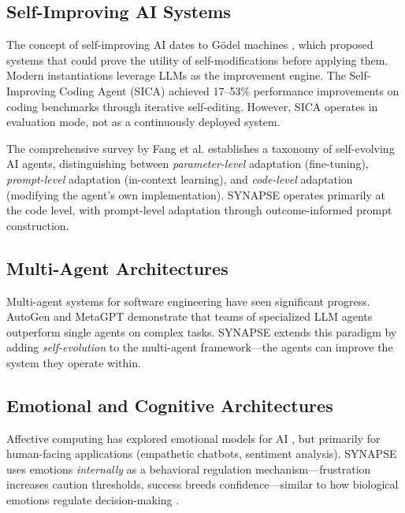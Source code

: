 \documentclass[11pt,a4paper]{article}
\begin{document}
\subsection{Self-Improving AI Systems}

The concept of self-improving AI dates to G\"{o}del machines \cite{schmidhuber2003godel}, which proposed systems that could prove the utility of self-modifications before applying them. Modern instantiations leverage LLMs as the improvement engine. The Self-Improving Coding Agent (SICA) \cite{sica2025} achieved 17--53\% performance improvements on coding benchmarks through iterative self-editing. However, SICA operates in evaluation mode, not as a continuously deployed system.

The comprehensive survey by Fang et al. \cite{fang2025survey} establishes a taxonomy of self-evolving AI agents, distinguishing between \textit{parameter-level} adaptation (fine-tuning), \textit{prompt-level} adaptation (in-context learning), and \textit{code-level} adaptation (modifying the agent's own implementation). SYNAPSE operates primarily at the code level, with prompt-level adaptation through outcome-informed prompt construction.

\subsection{Multi-Agent Architectures}

Multi-agent systems for software engineering have seen significant progress. AutoGen \cite{wu2023autogen} and MetaGPT \cite{hong2023metagpt} demonstrate that teams of specialized LLM agents outperform single agents on complex tasks. SYNAPSE extends this paradigm by adding \textit{self-evolution} to the multi-agent framework---the agents can improve the system they operate within.

\subsection{Emotional and Cognitive Architectures}

Affective computing has explored emotional models for AI \cite{picard2000affective}, but primarily for human-facing applications (empathetic chatbots, sentiment analysis). SYNAPSE uses emotions \textit{internally} as a behavioral regulation mechanism---frustration increases caution thresholds, success breeds confidence---similar to how biological emotions regulate decision-making \cite{damasio1994descartes}.
\end{document}

